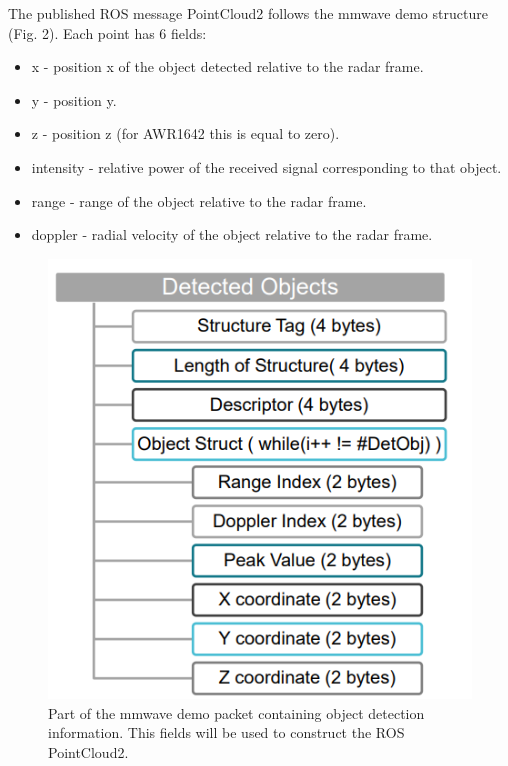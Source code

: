 \documentclass[12pt]{article}
\begin{document}
The published ROS message PointCloud2 follows the mmwave demo structure (Fig. 2). Each point has 6 fields:
\begin{itemize}
\item x - position x of the object detected relative to the radar frame.
\item y - position y.
\item z - position z (for AWR1642 this is equal to zero).
\item intensity - relative power of the received signal corresponding to that object.
\item range - range of the object relative to the radar frame.
\item doppler - radial velocity of the object relative to the radar frame.
\end{itemize}
\begin{figure}[!htb]
    \centering
    \includegraphics[scale=0.7]{2_demo_vis_struct.PNG}
    \caption{Part of the mmwave demo packet containing object detection information. This fields will be used to construct the ROS PointCloud2.}
    \label{fig:my_label}
\end{figure}
\end{document}
